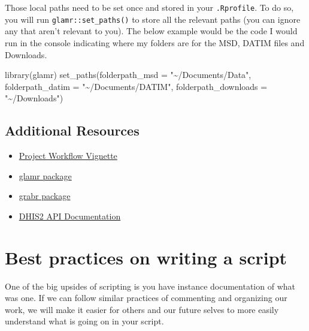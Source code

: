 \documentclass[
  letterpaper,
  DIV=11,
  numbers=noendperiod]{scrreprt}
\newenvironment{Shaded}{\begin{snugshade}}{\end{snugshade}}
\newcommand{\AttributeTok}[1]{\textcolor[rgb]{0.40,0.45,0.13}{#1}}
\newcommand{\FunctionTok}[1]{\textcolor[rgb]{0.28,0.35,0.67}{#1}}
\newcommand{\NormalTok}[1]{\textcolor[rgb]{0.00,0.23,0.31}{#1}}
\newcommand{\StringTok}[1]{\textcolor[rgb]{0.13,0.47,0.30}{#1}}
\providecommand{\tightlist}{%
  \setlength{\itemsep}{0pt}\setlength{\parskip}{0pt}}\usepackage{longtable,booktabs,array}
\begin{document}
Those local paths need to be set once and stored in your
\texttt{.Rprofile}. To do so, you will run \texttt{glamr::set\_paths()}
to store all the relevant paths (you can ignore any that aren't relevant
to you). The below example would be the code I would run in the console
indicating where my folders are for the MSD, DATIM files and Downloads.

\begin{Shaded}
\begin{Highlighting}[]
\FunctionTok{library}\NormalTok{(glamr)}
\FunctionTok{set\_paths}\NormalTok{(}\AttributeTok{folderpath\_msd =} \StringTok{"\textasciitilde{}/Documents/Data"}\NormalTok{,}
  \AttributeTok{folderpath\_datim =}  \StringTok{"\textasciitilde{}/Documents/DATIM"}\NormalTok{,}
  \AttributeTok{folderpath\_downloads =}  \StringTok{"\textasciitilde{}/Downloads"}\NormalTok{)}
\end{Highlighting}
\end{Shaded}

\hypertarget{additional-resources-3}{%
\section{Additional Resources}\label{additional-resources-3}}

\begin{itemize}
\tightlist
\item
  \href{https://usaid-oha-si.github.io/glamr/articles/project-workflow.html}{Project
  Workflow Vignette}
\item
  \href{https://usaid-oha-si.github.io/glamr/}{glamr package}
\item
  \href{https://usaid-oha-si.github.io/grabr/}{grabr package}
\item
  \href{https://docs.dhis2.org/en/develop/using-the-api/dhis-core-version-240/introduction.html}{DHIS2
  API Documentation}
\end{itemize}

\hypertarget{best-practices-on-writing-a-script}{%
\chapter{Best practices on writing a
script}\label{best-practices-on-writing-a-script}}

One of the big upsides of scripting is you have instance documentation
of what was one. If we can follow similar practices of commenting and
organizing our work, we will make it easier for others and our future
selves to more easily understand what is going on in your script.
\end{document}
